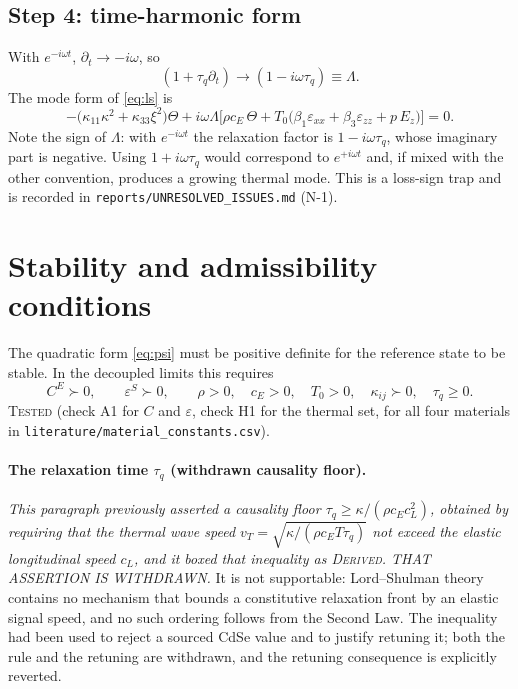\documentclass[11pt]{article}
\newcommand{\eps}{\varepsilon}
\theoremstyle{plain}
\begin{document}
\subsection{Step 4: time-harmonic form}
With $e^{-i\omega t}$, $\partial_t\to -i\omega$, so
\begin{equation}
  (1+\tau_q\partial_t) \longrightarrow (1 - i\omega\tau_q) \equiv \Lambda .
  \label{eq:Lambda}
\end{equation}
The mode form of \eqref{eq:ls} is
\begin{equation}
  -\big(\kappa_{11}\kappa^2 + \kappa_{33}\xi^2\big)\Theta
  + i\omega\Lambda\Big[\rho c_E\,\Theta
    + T_0\big(\beta_1\eps_{xx} + \beta_3\eps_{zz} + p\,E_z\big)\Big] = 0 .
  \label{eq:ls-mode}
\end{equation}
Note the sign of $\Lambda$: with $e^{-i\omega t}$ the relaxation factor is
$1-i\omega\tau_q$, whose imaginary part is negative. Using $1+i\omega\tau_q$
would correspond to $e^{+i\omega t}$ and, if mixed with the other convention,
produces a growing thermal mode. This is a loss-sign trap and is recorded in
\texttt{reports/UNRESOLVED\_ISSUES.md} (N-1).

\section{Stability and admissibility conditions}
\label{sec:stability}

The quadratic form \eqref{eq:psi} must be positive definite for the reference
state to be stable. In the decoupled limits this requires
\begin{equation}
  C^{E} \succ 0,\qquad \eps^{S} \succ 0,\qquad
  \rho>0,\quad c_E>0,\quad T_0>0,\quad \kappa_{ij}\succ 0,\quad \tau_q\ge 0 .
  \label{eq:stability}
\end{equation}
\textsc{Tested} (check A1 for $C$ and $\eps$, check H1 for the thermal set,
for all four materials in \texttt{literature/material\_constants.csv}).

\paragraph{The relaxation time $\tau_q$ (withdrawn causality floor).}
\emph{This paragraph previously asserted a causality floor
$\tau_q\ge\kappa/(\rho c_E c_L^2)$, obtained by requiring that the thermal wave
speed $v_T=\sqrt{\kappa/(\rho c_ET\tau_q)}$ not exceed the elastic longitudinal
speed $c_L$, and it boxed that inequality as \textsc{Derived}. THAT ASSERTION IS
WITHDRAWN.} It is not supportable: Lord--Shulman theory contains no mechanism
that bounds a constitutive relaxation front by an elastic signal speed, and no
such ordering follows from the Second Law. The inequality had been used to
reject a sourced CdSe value and to justify retuning it; both the rule and the
retuning are withdrawn, and the retuning consequence is explicitly reverted.
\end{document}
